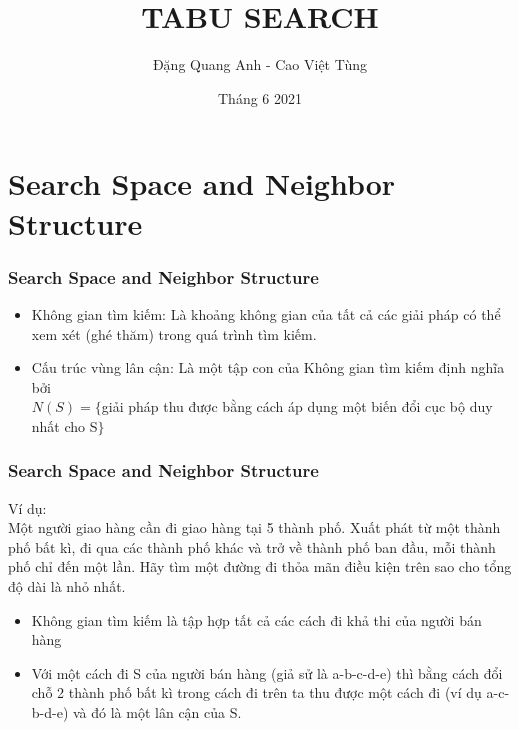 \documentclass[12pt]{beamer}
\begin{document}
	\author{Đặng Quang Anh - Cao Việt Tùng}
	\title{TABU SEARCH}
	\date{Tháng 6 2021}
	\maketitle
	
	
	\section{Search Space and Neighbor Structure}
	\begin{frame}
		\frametitle{Search Space and Neighbor Structure}
		\begin{itemize}
			\item Không gian tìm kiếm: Là khoảng không gian của tất cả các giải pháp có thể xem xét (ghé thăm) trong quá trình tìm kiếm.
			\item Cấu trúc vùng lân cận: Là một tập con của Không gian tìm kiếm định nghĩa bởi\\
			$N(S) = \{ $giải pháp thu được bằng cách áp dụng một biến đổi cục bộ duy nhất cho S$ \}$
		\end{itemize}
	\end{frame}
	
	\begin{frame}
		\frametitle{Search Space and Neighbor Structure}
		Ví dụ:\\
		Một người giao hàng cần đi giao hàng tại 5 thành phố. Xuất phát từ một thành phố bất kì, đi qua các thành phố khác  và trở về thành phố ban đầu, mỗi thành phố chỉ đến một lần. Hãy tìm một đường đi thỏa mãn điều kiện trên sao cho tổng độ dài là nhỏ nhất.\\
		\begin{itemize}
			\item Không gian tìm kiếm là tập hợp tất cả các cách đi khả thi của người bán hàng
			\item Với một cách đi S của người bán hàng (giả sử là a-b-c-d-e) thì bằng cách đổi chỗ 2 thành phố bất kì trong cách đi trên ta thu được một cách đi (ví dụ a-c-b-d-e) và đó là một lân cận của S.
		\end{itemize}
	\end{frame}
	
\end{document}
